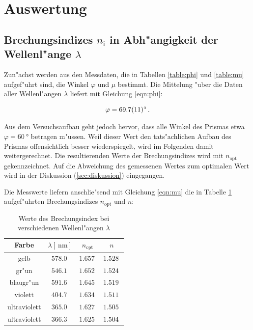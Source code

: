 \section{Auswertung}
\label{sec:auswertung}

	\subsection{Brechungsindizes $n_\mathrm{i}$ in Abh"angigkeit der Wellenl"ange $\lambda$}
	\label{subsec:brechungsindizes}
		Zun"achst werden aus den Messdaten, die in Tabellen \ref{table:phi} und \ref{table:mu} aufgef"uhrt sind, die Winkel $\varphi$ und $\mu$ bestimmt.
		Die Mittelung "uber die Daten aller Wellenl"angen $\lambda$ liefert mit Gleichung \eqref{eqn:phi}:

		\begin{equation*}
			\varphi = \SI{69.7 (11)}{\degree} \,.
		\end{equation*}

		Aus dem Versuchsaufbau geht jedoch hervor, dass alle Winkel des Prismas etwa $\varphi = \SI{60}{\degree}$ betragen m"ussen.
		Weil dieser Wert den tats"achlichen Aufbau des Prismas offensichtlich besser wiederspiegelt, wird im Folgenden damit weitergerechnet.
		Die resultierenden Werte der Brechungsindizes wird mit $n_\mathrm{opt}$ gekennzeichnet.
		Auf die Abweichung des gemessenen Wertes zum optimalen Wert wird in der Diskussion (\ref{sec:diskussion}) eingegangen.

		Die Messwerte liefern anschlie"send mit Gleichung \eqref{eqn:mu} die in Tabelle \ref{table:brechungsindizes} aufgef"uhrten Brechungsindizes $n_\mathrm{opt}$ und $n$:

		\begin{table}[h!]
			\begin{center}
				\caption{Werte des Brechungsindex bei verschiedenen Wellenl"angen $\lambda$ \label{table:brechungsindizes}}
				\begin{tabular}{|c|c|c|c|}
					\hline
						Farbe & $\lambda [\SI{}{\nano \meter}]$ & $n_\mathrm{opt}$ & $n$ \\
					\hline 
					\hline
						gelb & $\SI{578.0}{}$ & $\SI{1.657}{}$ & $\SI{1.528}{}$ \\
						gr"un & $\SI{546.1}{}$ & $\SI{1.652}{}$ & $\SI{1.524}{}$ \\
						blaugr"un & $\SI{591.6}{}$ & $\SI{1.645}{}$ & $\SI{1.519}{}$ \\
						violett & $\SI{404.7}{}$ & $\SI{1.634}{}$ & $\SI{1.511}{}$ \\
						ultraviolett & $\SI{365.0}{}$ & $\SI{1.627}{}$ & $\SI{1.505}{}$ \\
						ultraviolett & $\SI{366.3}{}$ & $\SI{1.625}{}$ & $\SI{1.504}{}$ \\
					\hline 
				\end{tabular}
			\end{center}
		\end{table}

